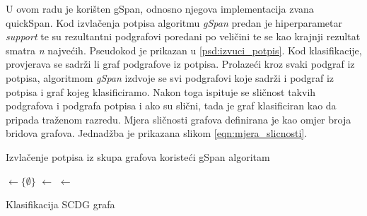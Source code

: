 U ovom radu je korišten gSpan, odnosno njegova implementacija zvana quickSpan.
Kod izvlačenja potpisa algoritmu \textit{gSpan} predan je hiperparametar
\textit{support} te su rezultantni podgrafovi poredani po veličini te se kao
krajnji rezultat smatra \textit{n} najvećih. Pseudokod je prikazan u
\ref{psd:izvuci_potpis}. Kod klasifikacije, provjerava se sadrži li graf
podgrafove iz potpisa. Prolazeći kroz svaki podgraf iz potpisa, algoritmom
\textit{gSpan} izdvoje se svi podgrafovi koje sadrži i podgraf iz potpisa i graf
kojeg klasificiramo. Nakon toga ispituje se sličnost takvih podgrafova i
podgrafa potpisa i ako su slični, tada je graf klasificiran kao da pripada
traženom razredu. Mjera sličnosti grafova definirana je kao omjer broja bridova
grafova. Jednadžba je prikazana slikom \ref{eqn:mjera_slicnosti}. \\




\begin{algorithm}[H]
    \caption{Izvlačenje potpisa iz skupa grafova koristeći gSpan algoritam
    \label{psd:izvuci_potpis}
    }


    \Sign$\leftarrow \{\emptyset\}$ \;
    \CSG$\leftarrow$ \gSpan{\Gin, \Support} \;
    \MaxCSG$\leftarrow$ \sortiraj{\CSG, \n} 

    \lForEach{\g$ \in$ \MaxCSG}{\Sign$ \leftarrow$ \Sign$ \cup$ \{\g\} }
\end{algorithm}



\begin{algorithm}[H]
    \caption{Klasifikacija SCDG grafa
    \label{psd:klasifikacija}
    }




\end{algorithm}

